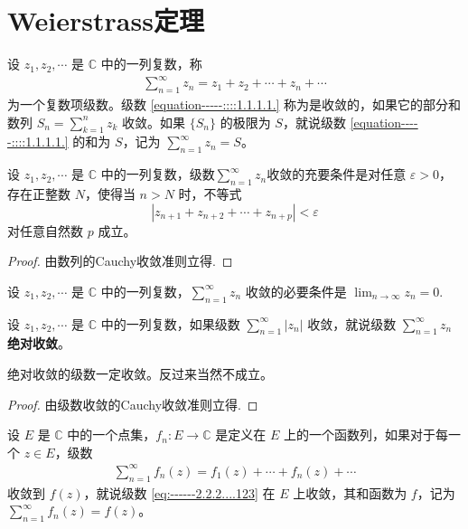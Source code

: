 \documentclass[../../main.tex]{subfiles}
\begin{document}
\section{Weierstrass定理}

\begin{definition}
设 \( z_1, z_2, \cdots \) 是 \( \mathbb{C} \) 中的一列复数，称
\begin{align}
\sum_{n=1}^{\infty} z_n = z_1 + z_2 + \cdots + z_n + \cdots \label{equation-----::::1.1.1.1.}
\end{align}
为一个复数项级数。级数 \eqref{equation-----::::1.1.1.1.} 称为是收敛的，如果它的部分和数列 \( S_n = \sum_{k=1}^{n} z_k \) 收敛。如果 \( \{S_n\} \) 的极限为 \( S \)，就说级数 \eqref{equation-----::::1.1.1.1.} 的和为 \( S \)，记为 \( \sum_{n=1}^{\infty} z_n = S \)。
\end{definition}

\begin{theorem}[Cauchy收敛准则]
设 \( z_1, z_2, \cdots \) 是 \( \mathbb{C} \) 中的一列复数，级数$\sum_{n=1}^{\infty} z_n$收敛的充要条件是对任意 \( \varepsilon > 0 \)，存在正整数 \( N \)，使得当 \( n > N \) 时，不等式
\[
|z_{n + 1} + z_{n + 2} + \cdots + z_{n + p}| < \varepsilon
\]
对任意自然数 \( p \) 成立。
\end{theorem}
\begin{proof}
由数列的Cauchy收敛准则立得.
\end{proof}

\begin{corollary}\label{corollary:复幂级数收敛必要条件}
设 \( z_1, z_2, \cdots \) 是 \( \mathbb{C} \) 中的一列复数，\( \sum_{n=1}^{\infty} z_n \) 收敛的必要条件是 \( \lim_{n \to \infty} z_n = 0 \).
\end{corollary}

\begin{definition}
设 \( z_1, z_2, \cdots \) 是 \( \mathbb{C} \) 中的一列复数，如果级数 \( \sum_{n=1}^{\infty} |z_n| \) 收敛，就说级数 \( \sum_{n=1}^{\infty} z_n \) \textbf{绝对收敛}。
\end{definition}

\begin{proposition}
绝对收敛的级数一定收敛。反过来当然不成立。
\end{proposition}
\begin{proof}
由级数收敛的Cauchy收敛准则立得.
\end{proof}

\begin{definition}
设 \( E \) 是 \( \mathbb{C} \) 中的一个点集，\( f_n: E \to \mathbb{C} \) 是定义在 \( E \) 上的一个函数列，如果对于每一个 \( z \in E \)，级数
\begin{align}
\sum_{n=1}^{\infty} f_n(z) = f_1(z) + \cdots + f_n(z) + \cdots\label{eq:------2.2.2....123}
\end{align}
收敛到 \( f(z) \)，就说级数 \eqref{eq:------2.2.2....123} 在 \( E \) 上收敛，其和函数为 \( f \)，记为 \( \sum_{n=1}^{\infty} f_n(z) = f(z) \)。
\end{definition}
\end{document}
